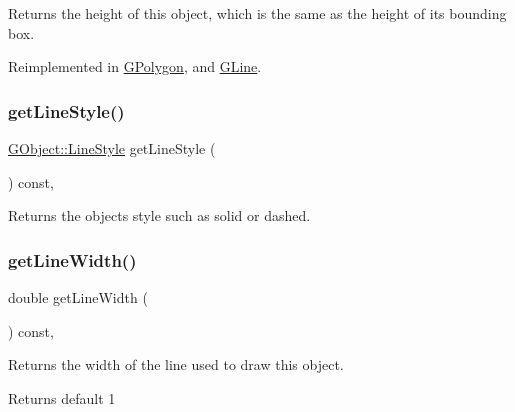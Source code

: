 Returns the height of this object, which is the same as the height of its bounding box. 



Reimplemented in \mbox{\hyperlink{classsgl_1_1GPolygon_a2bede8b27b21ae4c7940e762cbad9e07}{G\+Polygon}}, and \mbox{\hyperlink{classsgl_1_1GLine_a2bede8b27b21ae4c7940e762cbad9e07}{G\+Line}}.

\mbox{\label{classsgl_1_1GObject_aaf1f5ea8281e5e3486662878d26f0a13}} 
\subsubsection{\texorpdfstring{get\+Line\+Style()}{getLineStyle()}}
{\footnotesize\ttfamily \mbox{\hyperlink{classsgl_1_1GObject_a86e0f5648542856159bb40775c854aa7}{G\+Object\+::\+Line\+Style}} get\+Line\+Style (\begin{DoxyParamCaption}{ }\end{DoxyParamCaption}) const\hspace{0.3cm}{\ttfamily [virtual]}, {\ttfamily [inherited]}}



Returns the object\textquotesingle{}s style such as solid or dashed. 

\mbox{\label{classsgl_1_1GObject_a85ff266dc3eb63d9f2d8e5a4487fd3c0}} 
\subsubsection{\texorpdfstring{get\+Line\+Width()}{getLineWidth()}}
{\footnotesize\ttfamily double get\+Line\+Width (\begin{DoxyParamCaption}{ }\end{DoxyParamCaption}) const\hspace{0.3cm}{\ttfamily [virtual]}, {\ttfamily [inherited]}}



Returns the width of the line used to draw this object. 

\begin{DoxyReturn}{Returns}
default 1 
\end{DoxyReturn}
\mbox{\label{classsgl_1_1GObject_a4f83802015511edeb63b892830812c11}} 
